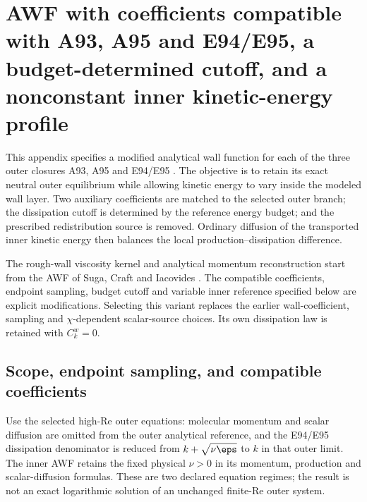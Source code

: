 %   

\section{AWF with coefficients compatible with A93, A95 and E94/E95,
a budget-determined cutoff, and a nonconstant inner kinetic-energy profile}
\label{mawf:appendix}

This appendix specifies a modified analytical wall function for each of
the three outer closures A93, A95 and E94/E95
\citep{Shih1993,Shih1995ASM,Shih1994EVM,Shih1995EVM}.
The objective is to retain its exact neutral outer equilibrium while
allowing kinetic energy to vary inside the modeled wall layer.
Two auxiliary coefficients are matched to the selected outer branch;
the dissipation cutoff is determined by the reference energy budget;
and the prescribed redistribution source is removed. Ordinary diffusion
of the transported inner kinetic energy then balances the local
production--dissipation difference.

The rough-wall viscosity kernel and analytical momentum reconstruction
start from the AWF of Suga, Craft and Iacovides \citep{SCI2006}.
The compatible coefficients, endpoint sampling, budget cutoff and
variable inner reference specified below are explicit modifications.
Selecting this variant replaces the earlier wall-coefficient,
sampling and \(\chi\)-dependent scalar-source choices. Its own
dissipation law is retained with \(C_k^w=0\).

\subsection{Scope, endpoint sampling, and compatible coefficients}
\label{mawf:coefficients}

Use the selected high-Re outer equations: molecular momentum and scalar
diffusion are omitted from the outer analytical reference, and the
E94/E95 dissipation denominator is reduced from
\(k+\sqrt{\nu\eps}\) to \(k\) in that outer limit.
The inner AWF retains the fixed physical \(\nu>0\) in its momentum,
production and scalar-diffusion formulas. These are two declared
equation regimes; the result is not an exact logarithmic solution of
an unchanged finite-Re outer system.

